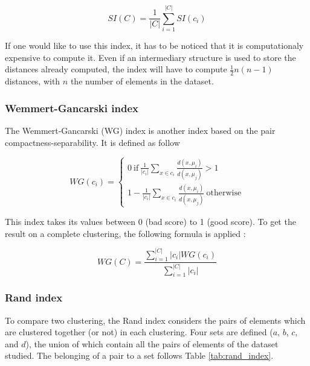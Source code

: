 \documentclass[a4paper]{report}
\begin{document}
    \begin{equation}
        SI(C) = \frac{1}{|C|}\sum_{i=1}^{|C|} SI(c_i)
        \label{eq:si_clustering}
    \end{equation}

    If one would like to use this index, it has to be noticed that it is computationaly expensive to compute it. Even if an intermediary structure is used to store the distances already computed, the index will have to compute $\frac{1}{2}n(n-1)$ distances, with $n$ the number of elements in the dataset.
    
    \subsubsection{Wemmert-Gancarski index}
    The Wemmert-Gancarski (WG) index is another index based on the pair compactness-separability. It is defined as follow

    \begin{equation}
        WG(c_i) = 
        \begin{cases}
            0 ~ \text{if}\ \frac{1}{|c_i|}\sum_{x \in c_i} \frac{d(x,\mu_i)}{d(x, \mu_j)} > 1\\
            1 - \frac{1}{|c_i|}\sum_{x \in c_i} \frac{d(x,\mu_i)}{d(x, \mu_j)} ~ \text{otherwise}
        \end{cases}
        \label{eq:wg_index}
    \end{equation}

    This index takes its values between 0 (bad score) to 1 (good score). To get the result on a complete clustering, the following formula is applied :

    \begin{equation}
        WG(C) = \frac{\sum_{i=1}^{|C|} |c_i| WG(c_i)}{\sum_{i=1}^{|C|} |c_i|}
        \label{eq:wg_index_global}
    \end{equation}

    \subsubsection{Rand index}
    To compare two clustering, the Rand index considers the pairs of elements which are clustered together (or not) in each clustering. Four sets are defined ($a$, $b$, $c$, and $d$), the union of which contain all the pairs of elements of the dataset studied. The belonging of a pair to a set follows Table \ref{tab:rand_index}.
    
\end{document}
